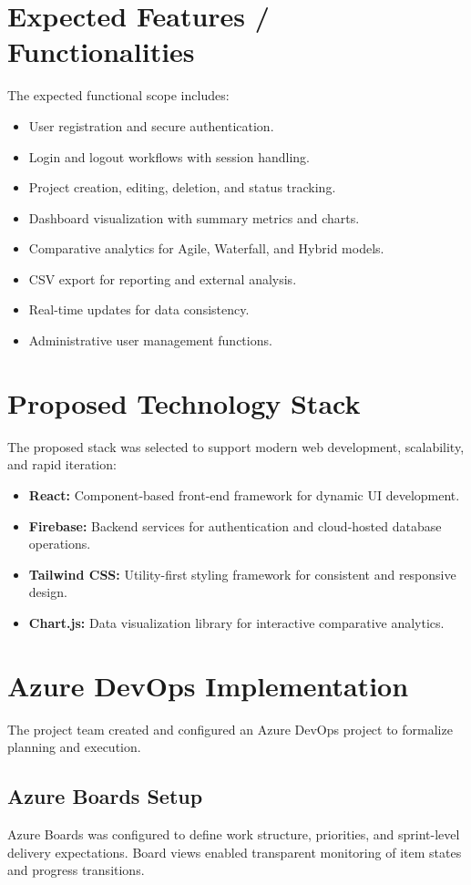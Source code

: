 \documentclass[12pt,a4paper]{article}
\begin{document}
\section{Expected Features / Functionalities}
The expected functional scope includes:
\begin{itemize}
    \item User registration and secure authentication.
    \item Login and logout workflows with session handling.
    \item Project creation, editing, deletion, and status tracking.
    \item Dashboard visualization with summary metrics and charts.
    \item Comparative analytics for Agile, Waterfall, and Hybrid models.
    \item CSV export for reporting and external analysis.
    \item Real-time updates for data consistency.
    \item Administrative user management functions.
\end{itemize}

\section{Proposed Technology Stack}
The proposed stack was selected to support modern web development, scalability, and rapid iteration:
\begin{itemize}
    \item \textbf{React:} Component-based front-end framework for dynamic UI development.
    \item \textbf{Firebase:} Backend services for authentication and cloud-hosted database operations.
    \item \textbf{Tailwind CSS:} Utility-first styling framework for consistent and responsive design.
    \item \textbf{Chart.js:} Data visualization library for interactive comparative analytics.
\end{itemize}

\section{Azure DevOps Implementation}
The project team created and configured an Azure DevOps project to formalize planning and execution.

\subsection{Azure Boards Setup}
Azure Boards was configured to define work structure, priorities, and sprint-level delivery expectations. Board views enabled transparent monitoring of item states and progress transitions.
\end{document}
